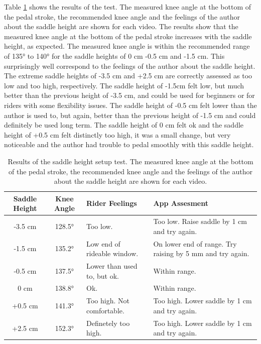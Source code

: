 Table \ref{tab:saddle_height_setup} shows the results of the test. The measured knee angle at the bottom of the pedal stroke, the recommended knee angle and the feelings of the author about the saddle height are shown for each video. The results show that the measured knee angle at the bottom of the pedal stroke increases with the saddle height, as expected. The measured knee angle is within the recommended range of 135° to 140° for the saddle heights of 0 cm -0.5 cm and -1.5 cm. This surprisingly well correspond to the feelings of the author about the saddle height. The extreme saddle heights of -3.5 cm and +2.5 cm are correctly assessed as too low and too high, respectively. The saddle height of -1.5cm felt low, but much better than the previous height of -3.5 cm, and could be used for beginners or for riders with some flexibility issues. The saddle height of -0.5 cm felt lower than the author is used to, but again, better than the previous height of -1.5 cm and could definitely be used long term. The saddle height of 0 cm felt ok and the saddle height of +0.5 cm felt distinctly too high, it was a small change, but very noticeable and the author had trouble to pedal smoothly with this saddle height.

\begin{table}[htbp]

    \centering
    \begin{tabular}{c c p{} p{}}
        \toprule
        Saddle Height & Knee Angle & Rider Feelings              & App Assesment                                             \\
        \midrule
        -3.5 cm       & 128.5°     & Too low.                    & Too low. Raise saddle by 1 cm and try again.              \\
        \midrule
        -1.5 cm       & 135.2°     & Low end of rideable window. & On lower end of range. Try raising by 5 mm and try again. \\
        \midrule
        -0.5 cm       & 137.5°     & Lower than used to, but ok. & Within range.                                             \\
        \midrule
        0 cm          & 138.8°     & Ok.                         & Within range.                                             \\
        \midrule
        +0.5 cm       & 141.3°     & Too high. Not comfortable.  & Too high. Lower saddle by 1 cm and try again.             \\
        \midrule
        +2.5 cm       & 152.3°     & Definetely too high.        & Too high. Lower saddle by 1 cm and try again.             \\
        \bottomrule
    \end{tabular}
    \caption{Results of the saddle height setup test. The measured knee angle at the bottom of the pedal stroke, the recommended knee angle and the feelings of the author about the saddle height are shown for each video.}
    \label{tab:saddle_height_setup}
\end{table}

